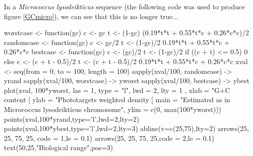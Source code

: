 \documentclass{article}
\begin{document}
\begin{figure}
\centering{}
\end{figure}


In a \textit{Micrococcus lysodeikticus} sequence (the following code
was used to produce figure \ref{GCmicro}), we can see that this 
is no longer true...

\begin{Schunk}
\begin{Sinput}
 worstcase <- function(gc){
   c <- gc
   t <- (1-gc)
   (0.19*t*t + 0.55*t*c + 0.26*c*c)/2
 }
 randomcase <- function(gc){
   c <- gc/2
   t <- (1-gc)/2
   0.19*t*t + 0.55*t*c + 0.26*c*c
 }
 bestcase <- function(gc){
   c <- (gc)/2
   t <- (1-gc)/2
   if ((c + t) <= 0.5){
     0
   } else {
   c <- (c + t - 0.5)/2
   t <- (c + t - 0.5)/2
   0.19*t*t + 0.55*t*c + 0.26*c*c
   }
 }
 xval <- seq(from = 0, to = 100, length = 100)
 sapply(xval/100, randomcase) -> yrand
 sapply(xval/100, worstcase) -> yworst
 sapply(xval/100, bestcase) -> ybest
 plot(xval, 100*yworst, las = 1, type = "l", lwd = 2, lty = 1 ,
 xlab = "G+C content [%
 ylab = "Phototargets weighted density [%
 main = "Estimated as in Micrococcus lysodeikticus chromosome",
 ylim = c(0, max(100*yworst)))
 points(xval,100*yrand,type='l',lwd=2,lty=2)
 points(xval,100*ybest,type='l',lwd=2,lty=3)
 abline(v=c(25,75),lty=2)
 arrows(25, 25, 75, 25, code = 1,le = 0.1)
 arrows(25, 25, 75, 25,code = 2,le = 0.1)
 text(50,25,"Biological range",pos=3)
\end{Sinput}
\end{Schunk}
\end{document}
